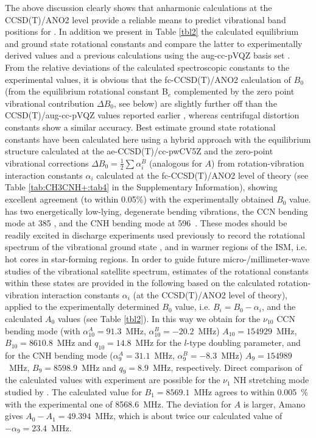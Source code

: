 The above discussion clearly shows that anharmonic calculations at the \\CCSD(T)/ANO2 level provide a reliable means to predict vibrational band positions for \pan. In addition we present in Table \ref{tbl2} the calculated equilibrium and ground state rotational constants and compare the latter to experimentally derived values \cite{GAM2000,AHH2006} and a previous calculations using the aug-cc-pVQZ basis set \cite{Cerqueira2020}. 
From the relative deviations of the calculated spectroscopic constants to the experimental values, it is obvious that the fc-CCSD(T)/ANO2 calculation of $B_0$ (from the equilibrium rotational constant B$_e$ complemented by the zero point vibrational contribution $\Delta B_0$, see below) are slightly further off than the CCSD(T)/aug-cc-pVQZ values
reported earlier \cite{Cerqueira2020}, whereas centrifugal distortion constants show a similar accuracy. 
Best estimate ground state rotational constants have been calculated here using a hybrid approach with the equilibrium structure
calculated at the ae-CCSD(T)/cc-pwCV5Z and the zero-point vibrational corrections $\Delta B_{0}=\frac{1}{2}\sum{\alpha_i^B}$ (analogous for $A$) from rotation-vibration interaction constants $\alpha_i$ calculated at the fc-CCSD(T)/ANO2 level of theory (see Table \ref{tab:CH3CNH+:tab4} in the Supplementary Information), showing excellent agreement (to within 0.05\%) with the experimentally obtained $B_0$ value. 
\pa has two energetically low-lying, degenerate bending vibrations, the CCN bending mode at 385 \wn, and the CNH bending mode at 596~\wn. These modes should be readily excited in discharge experiments used previously to record the rotational spectrum of the vibrational ground state \cite{GAM2000,AHH2006}, and in warmer regions of the ISM, i.e. hot cores in star-forming regions. In order to guide future micro-/millimeter-wave studies of the vibrational satellite spectrum, estimates of the rotational constants within these states are provided in the following based on the calculated rotation-vibration interaction constants $\alpha_i$ (at the CCSD(T)/ANO2 level of theory), applied to the experimentally determined $B_0$ value, i.e. $B_i=B_0-\alpha_i$, and the calculated $A_0$ values (see Table \ref{tbl2}). In this way we obtain for the $\nu_{10}$ CCN bending mode (with $\alpha^A_{10}=91.3$~MHz, $\alpha^B_{10}=-20.2$~MHz) $A_{10}=154929$~MHz, $B_{10}=8610.8$~MHz and $q_{10}=14.8$~MHz for the $l$-type doubling parameter, and for the CNH bending mode ($\alpha^A_{9}=31.1$~MHz, $\alpha^B_{9}=-8.3$~MHz) $A_9=154989$~MHz, $B_9=8598.9$~MHz and $q_9=8.9$~MHz, respectively. 
Direct comparison of the calculated values with experiment are possible for the $\nu_1$ NH stretching mode studied by \citet{Amano1992}. The calculated value for $B_1=8569.1$~MHz agrees to within 0.005~\% with the experimental one of 8568.6~MHz. The deviation for $A$ is larger, Amano gives $A_0-A_1=49.394$~MHz, which is about twice our calculated value of $-\alpha _9=23.4$~MHz.   

